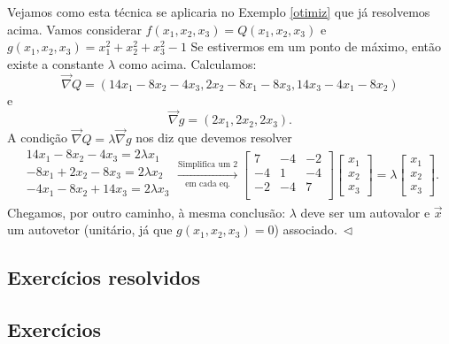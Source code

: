 \begin{obs}[Opcional]
	Vejamos como esta técnica se aplicaria no Exemplo \ref{otimiz} que já resolvemos acima. Vamos considerar $f(x_1,x_2,x_3) = Q(x_1,x_2,x_3)$ e $g(x_1,x_2,x_3) = x_1^2 + x_2^2 + x_3^2 - 1$ Se estivermos em um ponto de máximo, então existe a constante $\lambda$ como acima. Calculamos:
	\begin{equation}
	\vec{\nabla} Q = \left( 14x_1 - 8x_2 - 4 x_3, 2x_2 - 8 x_1 - 8 x_3, 14x_3 - 4 x_1 - 8 x_2 \right)
	\end{equation} e
	\begin{equation}
	\vec{\nabla} g = \left( 2 x_1, 2 x_2, 2 x_3 \right) .
	\end{equation} A condição $\vec{\nabla} Q = \lambda \vec{\nabla} g$ nos diz que devemos resolver
	\begin{equation}
	\begin{array}{c}
	14 x_1 - 8x_2 - 4 x_3 = 2 \lambda x_1 \\
	-8x_1 + 2x_2  - 8 x_3 = 2 \lambda x_2 \\
	- 4x_1 - 8 x_2 +14x_3 = 2 \lambda x_3 \\
	\end{array} \xrightarrow[\text{em cada eq.}]{\text{Simplifica um $2$}}
	\begin{bmatrix}
	7 & -4 & -2 \\
	-4 & 1 & -4 \\
	-2 & -4 & 7 \\
	\end{bmatrix}
	\begin{bmatrix}
	x_1 \\ x_2 \\ x_3
	\end{bmatrix} = \lambda
	\begin{bmatrix}
	x_1 \\ x_2 \\ x_3
	\end{bmatrix}.
	\end{equation} Chegamos, por outro caminho, à mesma conclusão: $\lambda$ deve ser um autovalor e $\vec{x}$ um autovetor (unitário, já que $g(x_1,x_2,x_3) = 0$) associado$. \ \lhd$
\end{obs}

\subsection*{Exercícios resolvidos}

\construirExeresol

\subsection*{Exercícios}

